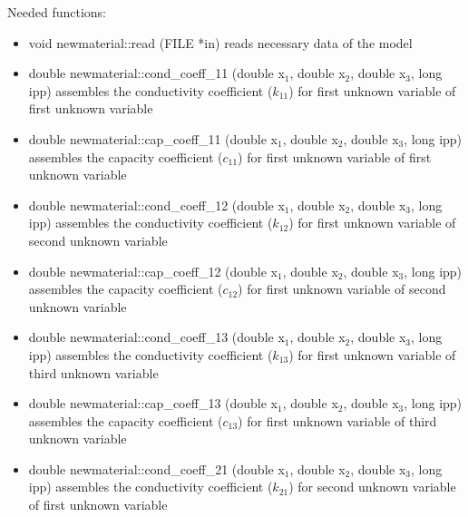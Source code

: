 Needed functions:
\begin{itemize}
\item{
{\sf void newmaterial::read (FILE *in)}
\newline reads necessary data of the model
}



\item{
{\sf double newmaterial::cond\_coeff\_11 (double x$_1$, double x$_2$, double x$_3$, long ipp)}
\newline assembles the conductivity coefficient ($k_{11}$) for first unknown variable of first unknown variable
}

\item{
{\sf double newmaterial::cap\_coeff\_11 (double x$_1$, double x$_2$, double x$_3$, long ipp)}
\newline assembles the capacity coefficient ($c_{11}$) for first unknown variable of first unknown variable
}

\item{
{\sf double newmaterial::cond\_coeff\_12 (double x$_1$, double x$_2$, double x$_3$, long ipp)}
\newline assembles the conductivity coefficient ($k_{12}$) for first unknown variable of second unknown variable
}

\item{
{\sf double newmaterial::cap\_coeff\_12 (double x$_1$, double x$_2$, double x$_3$, long ipp)}
\newline assembles the capacity coefficient ($c_{12}$) for first unknown variable of second unknown variable
}

\item{
{\sf double newmaterial::cond\_coeff\_13 (double x$_1$, double x$_2$, double x$_3$, long ipp)}
\newline assembles the conductivity coefficient ($k_{13}$) for first unknown variable of third unknown variable
}

\item{
{\sf double newmaterial::cap\_coeff\_13 (double x$_1$, double x$_2$, double x$_3$, long ipp)}
\newline assembles the capacity coefficient ($c_{13}$) for first unknown variable of third unknown variable
}



\item{
{\sf double newmaterial::cond\_coeff\_21 (double x$_1$, double x$_2$, double x$_3$, long ipp)}
\newline assembles the conductivity coefficient ($k_{21}$) for second unknown variable of first unknown variable
}


\end{itemize}
